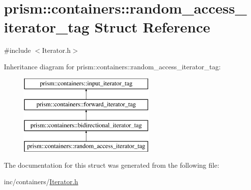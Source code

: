 \hypertarget{structprism_1_1containers_1_1random__access__iterator__tag}{}\section{prism\+:\+:containers\+:\+:random\+\_\+access\+\_\+iterator\+\_\+tag Struct Reference}
\label{structprism_1_1containers_1_1random__access__iterator__tag}


{\ttfamily \#include $<$Iterator.\+h$>$}

Inheritance diagram for prism\+:\+:containers\+:\+:random\+\_\+access\+\_\+iterator\+\_\+tag\+:\begin{figure}[H]
\begin{center}
\leavevmode
\includegraphics[height=4.000000cm]{structprism_1_1containers_1_1random__access__iterator__tag}
\end{center}
\end{figure}


The documentation for this struct was generated from the following file\+:\begin{DoxyCompactItemize}
\item 
inc/containers/\hyperlink{_iterator_8h}{Iterator.\+h}\end{DoxyCompactItemize}
